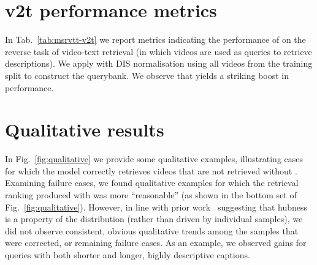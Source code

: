 \section{v2t performance metrics}
\label{sec:t2v}
\begin{table}
\begin{center}
\end{center}
\vspace{\spacebefore{}}
\caption{\textbf{MSR-VTT full split: Comparison to state of the art - v2t task.}\label{tab:msrvtt-v2t}}
\vspace{\spaceafter{}}
\end{table} In Tab.~\ref{tab:msrvtt-v2t} we report metrics indicating the
performance of \methodName on the reverse task of video-text retrieval
(in which videos are used as queries to retrieve descriptions).
We apply \methodName with DIS normalisation using all videos from the training split
to construct the querybank.
We observe that \methodName yields a striking boost in performance.

\section{Qualitative results}
\label{sec:qualitative}
In Fig.~\ref{fig:qualitative} we provide some qualitative examples,
illustrating cases for which the \methodName model correctly retrieves
videos that are not retrieved without \methodName.
Examining failure cases, we found qualitative examples for which
the retrieval ranking produced with \methodName was more ``reasonable''
(as shown in the bottom set of Fig.~\ref{fig:qualitative}).
However, in line with prior work~\cite{radovanovic2010hubs} suggesting that
hubness is a property of the distribution
(rather than driven by individual samples),
we did not observe consistent, obvious qualitative trends
among the samples that were corrected, or remaining failure cases.
As an example, we observed gains for queries with both shorter
and longer, highly descriptive captions.
